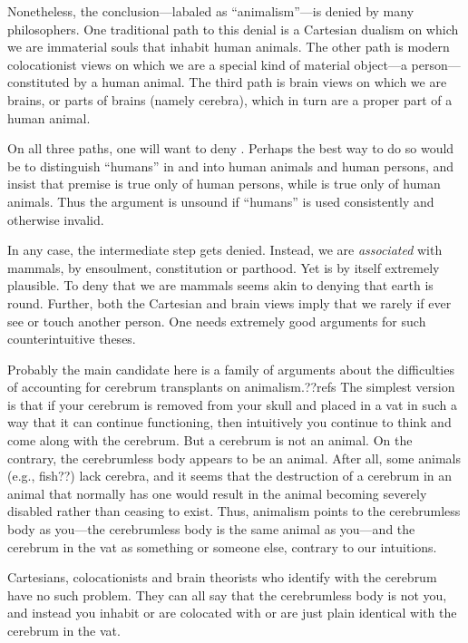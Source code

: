 Nonetheless, the conclusion---labaled as ``animalism''---is denied by many philosophers. One traditional path to 
this denial is a Cartesian dualism on which we are immaterial souls that inhabit human animals. The other path 
is modern colocationist views on which we are a special kind of material object---a person---constituted by a human 
animal. The third path is brain views on which we are brains, or parts of brains (namely cerebra), which in turn are a 
proper part of a human animal. 

On all three paths, one will want to deny . Perhaps the best way to do so would be to distinguish ``humans'' 
in  and  into  human animals and human persons, and insist that premise  is true 
only of human persons, while  is true only of human animals. Thus the argument is unsound if ``humans'' is used 
consistently and otherwise invalid. 

In any case, the intermediate step  gets denied. Instead, we are 
\textit{associated} with mammals, by ensoulment, constitution or parthood.   Yet  is by itself extremely plausible. 
To deny that we are mammals seems akin to denying that earth
is round. Further, both the Cartesian and brain views imply that we
rarely if ever see or touch another person. One needs extremely good arguments for such counterintuitive theses. 

Probably the main candidate here is a family of arguments about the difficulties of accounting for cerebrum transplants
on animalism.??refs The simplest version is that if your cerebrum is removed from your skull and placed in a vat in such a way
that it can continue functioning, then intuitively you continue to think and come along with the cerebrum. But a cerebrum
is not an animal. On the contrary, the cerebrumless body appears to be an animal. After all, some animals (e.g., fish??) lack
cerebra, and it seems that the destruction of a cerebrum in an animal that normally has one would result in the animal 
becoming severely disabled rather than ceasing to exist. Thus, animalism points to the cerebrumless body as you---the cerebrumless
body is the same animal as you---and the cerebrum in the vat as something  or someone else, contrary to our intuitions.

Cartesians, colocationists and brain theorists who identify with the cerebrum have no such problem. They can all say that
the cerebrumless body is not you, and instead you inhabit or are colocated with or are just plain identical with the cerebrum
in the vat. 

